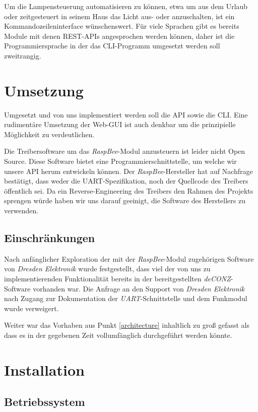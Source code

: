 \documentclass[a4paper,12pt]{article}
\begin{document}
Um die Lampensteuerung automatisieren zu können, etwa um aus dem Urlaub oder
zeitgesteuert in seinem Haus das Licht aus- oder anzuschalten, ist ein
Kommandozeileninterface wünschenswert. Für viele Sprachen gibt es bereits
Module mit denen REST-APIs angesprochen werden können, daher ist die
Programmiersprache in der das CLI-Programm umgesetzt werden soll zweitrangig.

\newpage

\section{Umsetzung}
\label{doing}

Umgesetzt und von uns implementiert werden soll die API sowie die CLI. Eine
rudimentäre Umsetzung der Web-GUI ist auch denkbar um die prinzipielle
Möglichkeit zu verdeutlichen.

Die Treibersoftware um das \emph{RaspBee}-Modul anzusteuern ist leider nicht
Open Source. Diese Software bietet eine Programmierschnittstelle, um welche
wir unsere API herum entwickeln können. Der \emph{RaspBee}-Hersteller hat auf
Nachfrage bestätigt, dass weder die UART-Spezifikation, noch der Quellcode
des Treibers öffentlich sei. Da ein Reverse-Engineering des Treibers den Rahmen
des Projekts sprengen würde haben wir uns darauf geeinigt, die Software des
Herstellers zu verwenden.

\subsection{Einschränkungen}

Nach anfänglicher Exploration der mit der \emph{RaspBee}-Modul zugehörigen Software
von \emph{Dresden Elektronik} wurde festgestellt, dass viel der von uns zu
implementierenden Funktionalität bereits in der bereitgestellten \emph{deCONZ}-
Software vorhanden war. Die Anfrage an den Support von \emph{Dresden Elektronik}
nach Zugang zur Dokumentation der \emph{UART}-Schnittstelle und dem Funkmodul
wurde verweigert.

Weiter war das Vorhaben aus Punkt \ref{architecture} inhaltlich zu groß gefasst
als dass es in der gegebenen Zeit vollumfänglich durchgeführt werden könnte.

\section{Installation}

\subsection{Betriebssystem}
\end{document}
